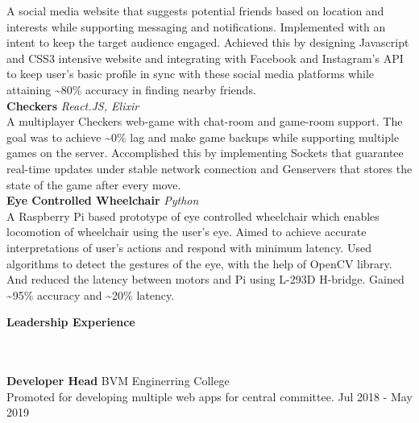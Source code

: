 \documentclass[]{article}
\newcommand{\lineunder} {
    \vspace*{-8pt} \\
    \hrulefill \\
}
\newcommand{\header} [1] {
    {\vspace*{6pt} \fontsize{12}{12}\selectfont \textbf{#1}}
     \lineunder
}
\begin{document}
{\addtolength{\leftskip}{2mm}
A social media website that suggests potential friends based on location and
interests while supporting messaging and notifications. Implemented with an
intent to keep the target audience engaged. Achieved this by designing
Javascript and CSS3 intensive website and integrating with Facebook and
Instagram's API to keep user's basic profile in sync with these social media
platforms while attaining \textasciitilde{}80\% accuracy in finding nearby
friends. \\}
\vspace*{2mm}
{\hspace{2mm}\textbf{Checkers}} {\sl React.JS, Elixir} \\
{\addtolength{\leftskip}{2mm}
A multiplayer Checkers web-game with chat-room and game-room support. The goal
was to achieve \textasciitilde{}0\% lag and make game backups while supporting
multiple games on the server. Accomplished this by implementing Sockets that
guarantee real-time updates under stable network connection and Genservers that
stores the state of the game after every move. \\
}
\vspace*{2mm}
{\hspace{2mm}\textbf{Eye Controlled Wheelchair}} {\sl Python} \\
{\addtolength{\leftskip}{2mm}
A Raspberry Pi based prototype of eye controlled wheelchair which enables
locomotion of wheelchair using the user's eye. Aimed to achieve accurate
interpretations of user's actions and respond with minimum latency. Used
algorithms to detect the gestures of the eye, with the help of OpenCV library.
And reduced the latency between motors and Pi using L-293D H-bridge. Gained
\textasciitilde{}95\% accuracy and \textasciitilde{}20\% latency.\\
}
\vspace*{2mm}

\header{Leadership Experience}
\hspace{1mm}
\textbf{Developer Head} \hfill BVM Enginerring College\\
\hspace{1mm}
Promoted for developing multiple web apps for central committee. \hfill Jul 2018
- May 2019\\
\vspace*{2mm}

\ 
\end{document}
